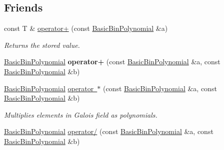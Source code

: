\subsection*{Friends}
\begin{DoxyCompactItemize}
\item 
\mbox{\label{class_g_flinalg_1_1_basic_bin_polynomial_ac37f8a0f92d7048e0adcae41f117700c}} 
const T \& \mbox{\hyperlink{class_g_flinalg_1_1_basic_bin_polynomial_ac37f8a0f92d7048e0adcae41f117700c}{operator+}} (const \mbox{\hyperlink{class_g_flinalg_1_1_basic_bin_polynomial}{Basic\+Bin\+Polynomial}} \&a)
\begin{DoxyCompactList}\small\item\em Returns the stored value. \end{DoxyCompactList}\item 
\mbox{\label{class_g_flinalg_1_1_basic_bin_polynomial_ae1e665254d4a5b1d7124ecf90a8022e3}} 
\mbox{\hyperlink{class_g_flinalg_1_1_basic_bin_polynomial}{Basic\+Bin\+Polynomial}} {\bfseries operator+} (const \mbox{\hyperlink{class_g_flinalg_1_1_basic_bin_polynomial}{Basic\+Bin\+Polynomial}} \&a, const \mbox{\hyperlink{class_g_flinalg_1_1_basic_bin_polynomial}{Basic\+Bin\+Polynomial}} \&b)
\item 
\mbox{\label{class_g_flinalg_1_1_basic_bin_polynomial_a03d37eed37268815ed3c957829185c55}} 
\mbox{\hyperlink{class_g_flinalg_1_1_basic_bin_polynomial}{Basic\+Bin\+Polynomial}} \mbox{\hyperlink{class_g_flinalg_1_1_basic_bin_polynomial_a03d37eed37268815ed3c957829185c55}{operator $\ast$}} (const \mbox{\hyperlink{class_g_flinalg_1_1_basic_bin_polynomial}{Basic\+Bin\+Polynomial}} \&a, const \mbox{\hyperlink{class_g_flinalg_1_1_basic_bin_polynomial}{Basic\+Bin\+Polynomial}} \&b)
\begin{DoxyCompactList}\small\item\em Multiplies elements in Galois field as polynomials. \end{DoxyCompactList}\item 
\mbox{\label{class_g_flinalg_1_1_basic_bin_polynomial_a6fe7167dabee806e90e03e75c241142c}} 
\mbox{\hyperlink{class_g_flinalg_1_1_basic_bin_polynomial}{Basic\+Bin\+Polynomial}} \mbox{\hyperlink{class_g_flinalg_1_1_basic_bin_polynomial_a6fe7167dabee806e90e03e75c241142c}{operator/}} (const \mbox{\hyperlink{class_g_flinalg_1_1_basic_bin_polynomial}{Basic\+Bin\+Polynomial}} \&a, const \mbox{\hyperlink{class_g_flinalg_1_1_basic_bin_polynomial}{Basic\+Bin\+Polynomial}} \&b)

\end{DoxyCompactItemize}

